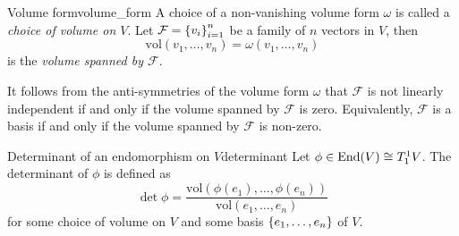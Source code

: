 \begin{definition}{Volume form}{volume_form}
    A choice of a non-vanishing volume form \(\omega\) is called a \emph{choice of volume on \(V\)}. Let \(\mathcal{F} = \left\{v_i\right\}_{i=1}^{n}\) be a family of \(n\) vectors in \(V\), then
    \begin{equation*}
        \mathrm{vol}(v_1, \dots, v_n) = \omega(v_1, \dots, v_n)
    \end{equation*}
    is the \emph{volume spanned by \(\mathcal{F}\)}.
\end{definition}
\begin{remark}
    It follows from the anti-symmetries of the volume form \(\omega\) that \(\mathcal{F}\) is not linearly independent if and only if the volume spanned by \(\mathcal{F}\) is zero. Equivalently, \(\mathcal{F}\) is a basis if and only if the volume spanned by \(\mathcal{F}\) is non-zero.
\end{remark}

\begin{definition}{Determinant of an endomorphism on \(V\)}{determinant}
    Let \(\phi \in \operatorname{End}(V) \cong T_1^1 V\). The determinant of \(\phi\) is defined as
    \begin{equation*}
        \det \phi = \frac{\mathrm{vol}(\phi(e_1), \dots, \phi(e_n))}{\mathrm{vol}(e_1, \dots, e_n)}
    \end{equation*}
    for some choice of volume on \(V\) and some basis \(\{e_1, \dots, e_n\}\) of \(V\).
\end{definition}


